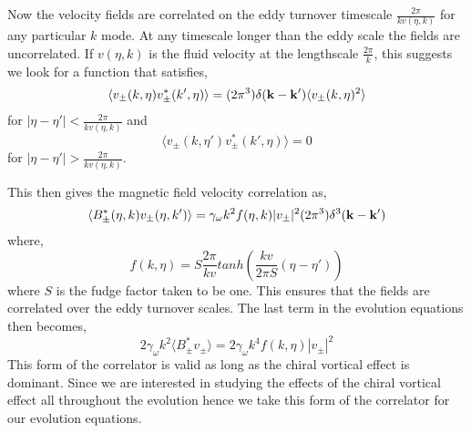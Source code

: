\documentclass{ws-mpla}
\begin{document}
Now the velocity fields are correlated on the eddy turnover timescale $\frac{2\pi}{k v(\eta,k)}$ for any particular $k$ mode. At any timescale longer than 
the eddy scale the fields are uncorrelated. If $v(\eta,k)$ is the fluid velocity at the lengthscale $\frac{2 \pi}{k}$, this suggests we look for a function that satisfies,  
\begin{equation}
 \langle v_{\pm}(k,\eta) v_{\pm}^{*} (k',\eta) \rangle =  (2 \pi^3) \delta({\bf {k - k'}}) \langle  v_{\pm}(k,\eta)^2 \rangle 
\end{equation}
for $|\eta - \eta'| < \frac{2 \pi}{k v(\eta,k)}$  and 
\begin{equation}
 \langle v_{\pm}(k,\eta') v_{\pm}^{*} (k',\eta) \rangle = 0 
\end{equation}
for $|\eta - \eta'| > \frac{2 \pi}{k v(\eta,k)}$. 

This then gives the magnetic field velocity correlation as, 
\begin{equation}
 \langle B_{\pm}^{*}(\eta,k) v_{\pm}(\eta,k') \rangle = \gamma_\omega k^2 f(\eta,k) |v_{\pm}|^2 (2 \pi^3) \delta^3 ({\bf {k - k'}}) 
\end{equation}
where,
\begin{equation}
 f(k,\eta) = S \frac{2 \pi}{k v} tanh \left(\frac{kv}{2 \pi S} (\eta -\eta') \right)
\end{equation}
where $S$ is the fudge factor taken to be one. This ensures that the fields are correlated over the eddy turnover scales.
The last term in the evolution equations then becomes, 
\begin{equation}
 2\gamma_{\omega} k^2 \langle B_{\pm}^{*} v_{\pm} \rangle =  2\gamma_{\omega} k^4 f(k,\eta) |v_{\pm}|^2
\end{equation}
This form of the correlator is valid as long as the chiral vortical effect is dominant. Since we are interested in studying the effects of the chiral vortical 
effect all throughout the evolution hence we take this form of the correlator for our evolution equations. 
\end{document}

